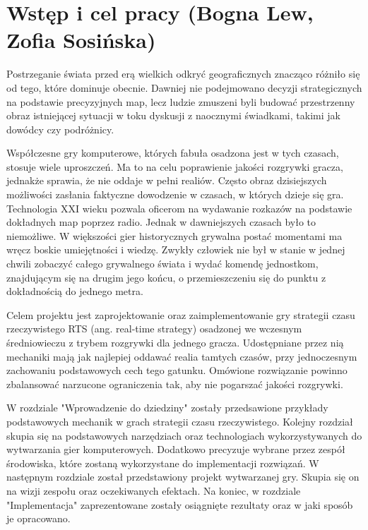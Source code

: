 \chapter{Wstęp i cel pracy (Bogna Lew, Zofia Sosińska)}\label{chap:introduction}

Postrzeganie świata przed erą wielkich odkryć geograficznych znacząco różniło się od tego, które dominuje obecnie. Dawniej
nie podejmowano decyzji strategicznych na podstawie precyzyjnych map, lecz ludzie zmuszeni byli  budować  przestrzenny obraz
istniejącej sytuacji w toku dyskusji z naocznymi świadkami, takimi jak dowódcy czy podróżnicy.

Współczesne gry komputerowe, których fabuła osadzona jest w tych czasach, stosuje wiele uproszczeń. Ma to na celu poprawienie jakości
rozgrywki gracza, jednakże sprawia, że nie oddaje w pełni realiów. Często obraz dzisiejszych możliwości zasłania faktyczne dowodzenie
w czasach, w których dzieje się gra. Technologia XXI wieku pozwala oficerom na wydawanie rozkazów na podstawie dokładnych map poprzez radio.
Jednak w dawniejszych czasach było to niemożliwe. W większości gier historycznych grywalna postać momentami ma wręcz boskie umiejętności i wiedzę. Zwykły człowiek nie był w
stanie w jednej chwili zobaczyć całego grywalnego świata i wydać komendę jednostkom, znajdującym się na drugim jego końcu, o przemieszczeniu
się do punktu z dokładnością do jednego metra.

Celem projektu jest zaprojektowanie oraz zaimplementowanie gry strategii czasu rzeczywistego RTS (ang. real-time strategy) osadzonej we wczesnym średniowieczu
z trybem rozgrywki dla jednego gracza. Udostępniane przez nią mechaniki mają jak najlepiej oddawać realia tamtych czasów, przy
jednoczesnym zachowaniu podstawowych cech tego gatunku. Omówione rozwiązanie powinno zbalansować narzucone ograniczenia tak, aby 
nie pogarszać jakości rozgrywki.

W rozdziale "Wprowadzenie do dziedziny" zostały przedsawione przykłady podstawowych mechanik w grach strategii czasu
rzeczywistego. Kolejny rozdział skupia się na podstawowych narzędziach oraz technologiach wykorzystywanych do wytwarzania
gier komputerowych. Dodatkowo precyzuje wybrane przez zespół środowiska, które zostaną wykorzystane do implementacji
rozwiązań. W następnym rozdziale został przedstawiony projekt wytwarzanej gry. Skupia się on na wizji zespołu oraz
oczekiwanych efektach. Na koniec, w rozdziale "Implementacja" zaprezentowane zostały osiągnięte rezultaty oraz w jaki
sposób je opracowano.
